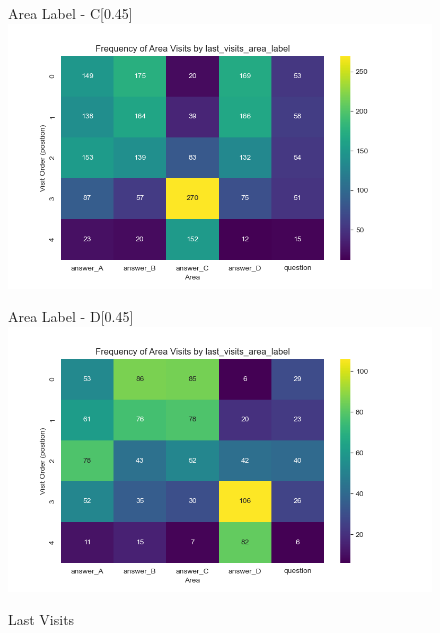 \documentclass{article}
\begin{document}
\begin{figure}[H]
  \begin{subcaptionbox}{Area Label - C\label{fig:al_c}}[0.45\textwidth]
    {\centering\includegraphics[width=\linewidth]{plots/visits/matrix__last_visits_area_label_gatherers_C.png}}
  \end{subcaptionbox}
  \hfill
  \begin{subcaptionbox}{Area Label - D\label{fig:al_d}}[0.45\textwidth]
    {\centering\includegraphics[width=\linewidth]{plots/visits/matrix__last_visits_area_label_gatherers_D.png}}
  \end{subcaptionbox}
  
  \caption{Last Visits}
  \label{fig:fourimages3}
\end{figure}
\end{document}

